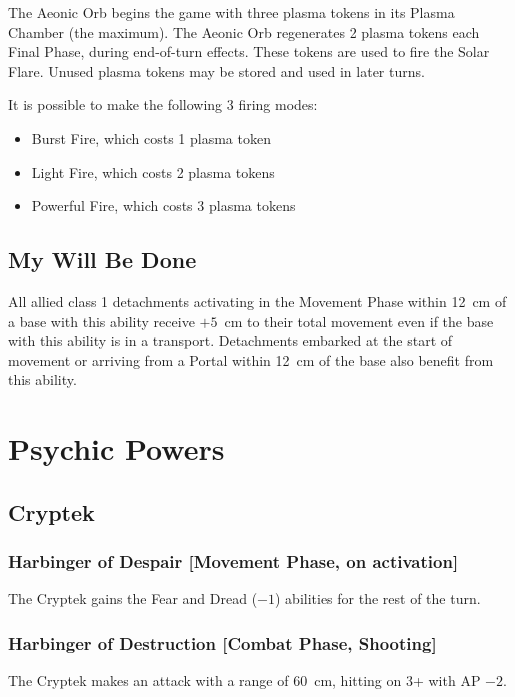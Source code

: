 The Aeonic Orb begins the game with three plasma tokens in its Plasma Chamber (the maximum). The Aeonic Orb regenerates 2 plasma tokens each Final Phase, during end-of-turn effects. These tokens are used to fire the Solar Flare. Unused plasma tokens may be stored and used in later turns.

It is possible to make the following 3 firing modes:

\begin{itemize}
    \item Burst Fire, which costs 1 plasma token
    \item Light Fire, which costs 2 plasma tokens
    \item Powerful Fire, which costs 3 plasma tokens
\end{itemize}

\subsection{My Will Be Done}

All allied class 1 detachments activating in the Movement Phase within 12~cm of a base with this ability receive $+5$~cm to their total movement even if the base with this ability is in a transport. Detachments embarked at the start of movement or arriving from a Portal within 12~cm of the base also benefit from this ability.

\section{Psychic Powers}

\subsection{Cryptek}

\subsubsection{Harbinger of Despair [Movement Phase, on activation]}

The Cryptek gains the Fear and Dread ($-1$) abilities for the rest of the turn.

\subsubsection{Harbinger of Destruction [Combat Phase, Shooting]}

The Cryptek makes an attack with a range of 60~cm, hitting on 3+ with AP $-2$.

